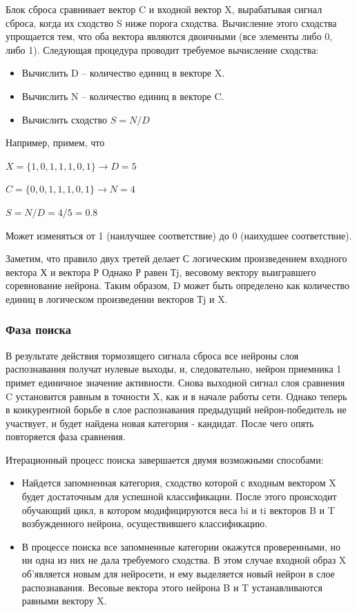 \documentclass[14pt,a4paper,report]{article}
\begin{document}
Блок сброса сравнивает вектор C и входной вектор X, вырабатывая сигнал сброса, когда их сходство S ниже порога сходства. Вычисление этого сходства упрощается тем, что оба вектора являются двоичными (все элементы либо 0, либо 1). Следующая процедура проводит требуемое вычисление сходства:

\begin{itemize}
	\item Вычислить D -- количество единиц в векторе X.
	\item Вычислить N -- количество единиц в векторе C.
	\item Вычислить сходство $S=N/D$
\end{itemize}

Например, примем, что

$X=\{1, 0, 1, 1, 1, 0, 1\} \rightarrow D = 5$

$C=\{0, 0, 1, 1, 1, 0, 1\} \rightarrow N = 4$

$S=N/D=4/5=0.8$

Может изменяться от 1 (наилучшее соответствие) до 0 (наихудшее соответствие).

Заметим, что правило двух третей делает С логическим произведением входного вектора Х и вектора Р \cite{cite-techn-adapt} Однако Р равен Тj, весовому вектору выигравшего соревнование нейрона. Таким образом, D может быть определено как количество единиц в логическом произведении векторов Тj и X.

\subsubsection{Фаза поиска}

В результате действия тормозящего сигнала сброса все нейроны слоя распознавания получат нулевые выходы, и, следовательно, нейрон приемника 1 примет единичное значение активности. Снова выходной сигнал слоя сравнения C установится равным в точности X, как и в начале работы сети. Однако теперь в конкурентной борьбе в слое распознавания предыдущий нейрон-победитель не участвует, и будет найдена новая категория - кандидат. После чего опять повторяется фаза сравнения.

Итерационный процесс поиска завершается двумя возможными способами:

\begin{itemize}
	\item Найдется запомненная категория, сходство которой с входным вектором X будет достаточным для успешной классификации. После этого происходит обучающий цикл, в котором модифицируются веса bi и ti векторов B и T возбужденного нейрона, осуществившего классификацию.
	\item В процессе поиска все запомненные категории окажутся проверенными, но ни одна из них не дала требуемого сходства. В этом случае входной образ X об'является новым для нейросети, и ему выделяется новый нейрон в слое распознавания. Весовые вектора этого нейрона B и T устанавливаются равными вектору X.
\end{itemize}
\end{document}
